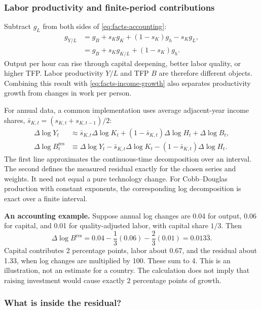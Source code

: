 \subsubsection{Labor productivity and finite-period contributions}

Subtract $g_L$ from both sides of \eqref{eq:facts-accounting}:
\begin{align}
g_{Y/L}
&=g_B+s_K g_K+(1-s_K)g_h-s_Kg_L,\\
&=g_B+s_Kg_{K/L}+(1-s_K)g_h.\label{eq:facts-labor-productivity}
\end{align}
Output per hour can rise through capital deepening, better labor quality, or
higher TFP. Labor productivity $Y/L$ and TFP $B$ are therefore different objects.
Combining this result with \eqref{eq:facts-income-growth} also separates
productivity growth from changes in work per person.

For annual data, a common implementation uses average adjacent-year income
shares, $\bar s_{K,t}=(s_{K,t}+s_{K,t-1})/2$:
\begin{align}
\Delta\log Y_t
&\approx \bar s_{K,t}\Delta\log K_t
 +(1-\bar s_{K,t})\Delta\log H_t
 +\Delta\log B_t,\label{eq:facts-discrete-accounting}\\
\Delta\log B_t^{\mathrm{res}}
&\equiv\Delta\log Y_t
 -\bar s_{K,t}\Delta\log K_t
 -(1-\bar s_{K,t})\Delta\log H_t.\label{eq:facts-residual}
\end{align}
The first line approximates the continuous-time decomposition over an interval.
The second defines the measured residual exactly for the chosen series and
weights. It need not equal a pure technology change. For Cobb--Douglas
production with constant exponents, the corresponding log decomposition is
exact over a finite interval.

\begin{blueblock}
\textbf{An accounting example.}
Suppose annual log changes are 0.04 for output, 0.06 for capital, and 0.01 for
quality-adjusted labor, with capital share $1/3$. Then
\[
\Delta\log B^{\mathrm{res}}
=0.04-\frac13(0.06)-\frac23(0.01)
=0.013\overline{3}.
\]
Capital contributes 2 percentage points, labor about 0.67, and the residual
about 1.33, when log changes are multiplied by 100. These sum to 4. This is an
illustration, not an estimate for a country. The calculation does not imply
that raising investment would cause exactly 2 percentage points of growth.
\end{blueblock}

\subsubsection{What is inside the residual?}

